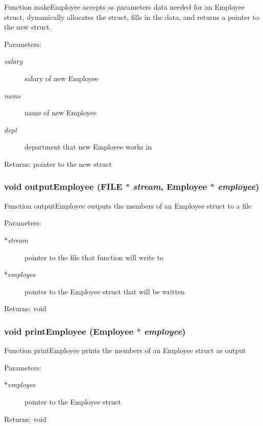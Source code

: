 Function make\-Employee accepts as parameters data needed for an Employee struct, dynamically allocates the struct, fills in the data, and returns a pointer to the new struct. \begin{Desc}
\item[Parameters:]
\begin{description}
\item[{\em salary}]salary of new Employee \item[{\em name}]name of new Employee \item[{\em dept}]department that new Employee works in \end{description}
\end{Desc}
\begin{Desc}
\item[Returns:]pointer to the new struct \end{Desc}
\subsubsection{\setlength{\rightskip}{0pt plus 5cm}void output\-Employee (FILE $\ast$ {\em stream}, \bf{Employee} $\ast$ {\em employee})}\label{mystructs_8h_fe0dfee3a22cda6855e076582ce67058}


Function output\-Employee outputs the members of an Employee struct to a file \begin{Desc}
\item[Parameters:]
\begin{description}
\item[{\em $\ast$stream}]pointer to the file that function will write to \item[{\em $\ast$employee}]pointer to the Employee struct that will be written \end{description}
\end{Desc}
\begin{Desc}
\item[Returns:]void \end{Desc}
\subsubsection{\setlength{\rightskip}{0pt plus 5cm}void print\-Employee (\bf{Employee} $\ast$ {\em employee})}\label{mystructs_8h_291560c311b426d2ea7f359bfc45ed5f}


Function print\-Employee prints the members of an Employee struct as output \begin{Desc}
\item[Parameters:]
\begin{description}
\item[{\em $\ast$employee}]pointer to the Employee struct \end{description}
\end{Desc}
\begin{Desc}
\item[Returns:]void \end{Desc}
